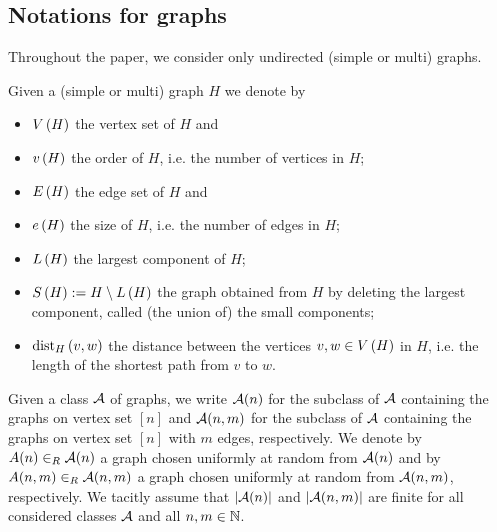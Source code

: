 \subsection{Notations for graphs}
Throughout the paper, we consider only undirected (simple or multi) graphs.
\begin{definition}
	Given a (simple or multi) graph $H$ we denote by
	\begin{itemize}
		\item 
		$V\left(H\right)$ the vertex set of $H$ and
		\item[]
		$v\left({H}\right)$ the order of $H$, i.e. the number of vertices in $H$;
		\item 
		$E\left(H\right)$ the edge set of $H$ and
		\item[]
		$e\left({H}\right)$ the size of $H$, i.e. the number of edges in $H$;	
		\item 
		$L\left(H\right)$ the largest component of $H$;
		\item
		$S\left(H\right):=H \setminus L\left(H\right)$ the graph obtained from $H$ by deleting the largest component, called (the union of) the small components;
		\item
		$\operatorname{dist}_{H}\left(v, w\right)$ the distance between the vertices $v,w\in V\left(H\right)$ in $H$, i.e. the length of the shortest path from $v$ to $w$. 
	\end{itemize}
\end{definition}
\begin{definition}\label{LSdef:graph_class}
	Given a class $\mathcal{A}$ of graphs, we write
	$\mathcal{A}(n)$ for the subclass of $\mathcal{A}$ containing the graphs on vertex set $[n]$ 
	and $\mathcal{A}(n,m)$ for the subclass of $\mathcal{A}$ containing the graphs on vertex set $[n]$ with $m$ edges, respectively. We denote by $A(n)\in_R \mathcal{A}(n)$ a graph chosen uniformly at random from $\mathcal{A}(n)$
	and by $A(n,m)\in_R \mathcal{A}(n,m)$ a graph chosen uniformly at random from $\mathcal{A}(n,m)$, respectively. We tacitly assume that $|\mathcal{A}(n)|$ and $|\mathcal{A}(n,m)|$ are finite for all considered classes $\mathcal{A}$ and all $n,m\in \mathbb{N}$.  
\end{definition}

